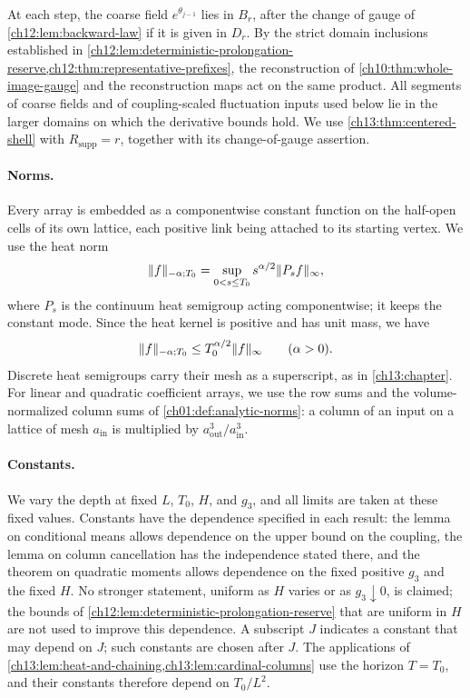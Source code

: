 At each step, the coarse field $e^{\theta_{j-1}}$ lies in $B_r$, after the change of gauge of \cref{ch12:lem:backward-law} if it is given in $D_r$. By the strict domain inclusions established in \cref{ch12:lem:deterministic-prolongation-reserve,ch12:thm:representative-prefixes}, the reconstruction of \cref{ch10:thm:whole-image-gauge} and the reconstruction maps act on the same product. All segments of coarse fields and of coupling-scaled fluctuation inputs used below lie in the larger domains on which the derivative bounds hold. We use \cref{ch13:thm:centered-shell} with $R_{\mathrm{supp}}=r$, together with its change-of-gauge assertion.

\paragraph{Norms.}
Every array is embedded as a componentwise constant function on the half-open cells of its own lattice, each positive link being attached to its starting vertex. We use the heat norm
\begin{equation}\label{ch14:eq:heat-norm}
 \lVert f\rVert_{-\alpha;T_0}=\sup_{0<s\le T_0}s^{\alpha/2}\lVert P_sf\rVert_\infty,
\end{equation}
where $P_s$ is the continuum heat semigroup acting componentwise; it keeps the constant mode. Since the heat kernel is positive and has unit mass, we have
\begin{equation}\label{ch14:eq:bounded-heat}
 \lVert f\rVert_{-\alpha;T_0}\le T_0^{\alpha/2}\lVert f\rVert_\infty\qquad(\alpha>0).
\end{equation}
Discrete heat semigroups carry their mesh as a superscript, as in \cref{ch13:chapter}. For linear and quadratic coefficient arrays, we use the row sums and the volume-normalized column sums of \cref{ch01:def:analytic-norms}: a column of an input on a lattice of mesh $a_{\mathrm{in}}$ is multiplied by $a_{\mathrm{out}}^3/a_{\mathrm{in}}^3$.

\paragraph{Constants.}
We vary the depth at fixed $L$, $T_0$, $H$, and $g_3$, and all limits are taken at these fixed values. Constants have the dependence specified in each result: the lemma on conditional means allows dependence on the upper bound on the coupling, the lemma on column cancellation has the independence stated there, and the theorem on quadratic moments allows dependence on the fixed positive $g_3$ and the fixed $H$. No stronger statement, uniform as $H$ varies or as $g_3\downarrow0$, is claimed; the bounds of \cref{ch12:lem:deterministic-prolongation-reserve} that are uniform in $H$ are not used to improve this dependence. A subscript $J$ indicates a constant that may depend on $J$; such constants are chosen after $J$. The applications of \cref{ch13:lem:heat-and-chaining,ch13:lem:cardinal-columns} use the horizon $T=T_0$, and their constants therefore depend on $T_0/L^2$.

